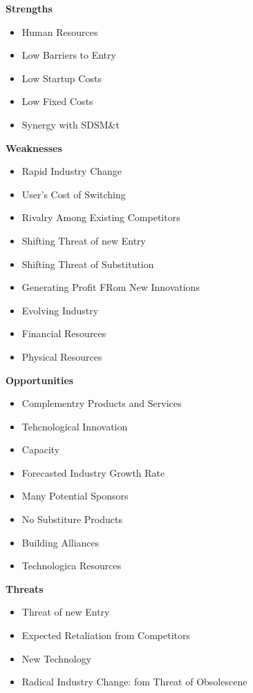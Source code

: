 \textbf{Strengths}
\begin{itemize}
	\item Human Resources
	\item Low Barriers to Entry
	\item Low Startup Costs
	\item Low Fixed Costs
	\item Synergy with SDSM\&t
\end{itemize}
\textbf{Weaknesses}
\begin{itemize}
	\item Rapid Industry Change
	\item User's Cost of Switching
	\item Rivalry Among Existing Competitors
	\item Shifting Threat of new Entry
	\item Shifting Threat of Substitution
	\item Generating Profit FRom New Innovations
	\item Evolving Industry
	\item Financial Resources
	\item Physical Resources
\end{itemize}
\textbf{Opportunities}
\begin{itemize}
	\item Complementry Products and Services
	\item Tehcnological Innovation
	\item Capacity
	\item Forecasted Industry Growth Rate
	\item Many Potential Sponsors
	\item No Substiture Products 
	\item Building Alliances
	\item Technologica Resources
\end{itemize}


\textbf{Threats}
\begin{itemize}
	\item Threat of new Entry
	\item Expected Retaliation from Competitors
	\item New Technology
	\item Radical Industry Change: fom Threat of Obsolescene
\end{itemize}